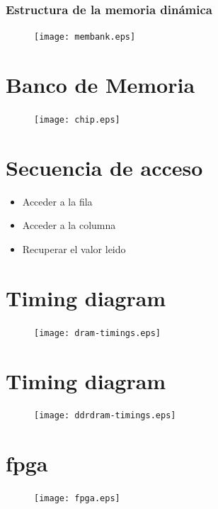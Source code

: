 \documentclass{beamer}
\begin{document}
\begin{frame}
\frametitle{Estructura de la  memoria dinámica}
\begin{figure}[!htb]
\centering
\texttt{[image: membank.eps]}
\end{figure}
\end{frame}

\section{Banco de Memoria}
\begin{frame}
\begin{figure}[!htb]
\centering
\texttt{[image: chip.eps]}
\end{figure}
\end{frame}

\section{Secuencia de acceso}
\begin{frame}
	\begin{itemize}
		\item Acceder a la fila
		\item Acceder a la columna
		\item Recuperar el valor leido
	\end{itemize}
\end{frame}

\section{Timing diagram}
\begin{frame}
\begin{figure}[!htb]
\centering
\texttt{[image: dram-timings.eps]}
\end{figure}
\end{frame}

\section{Timing diagram}
\begin{frame}
\begin{figure}[!htb]
\centering
\texttt{[image: ddrdram-timings.eps]}
\end{figure}
\end{frame}

\section{fpga}
\begin{frame}
\begin{figure}[!htb]
\centering
\texttt{[image: fpga.eps]}
\end{figure}
\end{frame}
\end{document}
